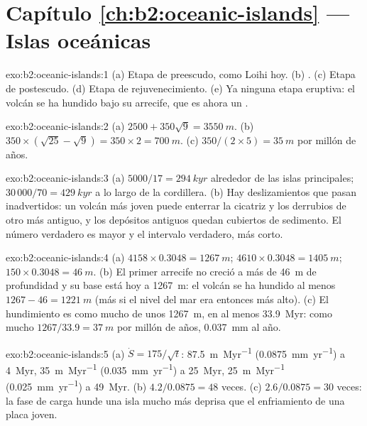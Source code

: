 \section*{Capítulo \ref{ch:b2:oceanic-islands} --- Islas oceánicas}

\begin{solution}{exo:b2:oceanic-islands:1}
(a) Etapa de preescudo, como Loihi hoy. (b) . (c) Etapa de postescudo. (d) Etapa de
rejuvenecimiento. (e) Ya ninguna etapa eruptiva: el volcán se ha hundido bajo su arrecife, que es ahora un .
\end{solution}

\begin{solution}{exo:b2:oceanic-islands:2}
(a) $2500 + 350\sqrt9 = \qty{3550}{m}$. (b) $350\times(\sqrt{25} - \sqrt9) = 350\times2 =
\qty{700}{m}$. (c) $350/(2\times5) = \qty{35}{m}$ por millón de años.
\end{solution}

\begin{solution}{exo:b2:oceanic-islands:3}
(a) $5000/17 = \qty{294}{kyr}$ alrededor de las islas principales; $30\,000/70 = \qty{429}{kyr}$ a lo largo de la
cordillera. (b) Hay deslizamientos que pasan inadvertidos: un volcán más joven puede enterrar la cicatriz y los derrubios de otro más antiguo,
y los depósitos antiguos quedan cubiertos de sedimento. El número verdadero es mayor y el intervalo verdadero,
más corto.
\end{solution}

\begin{solution}{exo:b2:oceanic-islands:4}
(a) $4158\times0.3048 = \qty{1267}{m}$; $4610\times0.3048 = \qty{1405}{m}$; $150\times0.3048 =
\qty{46}{m}$. (b) El primer arrecife no creció a más de \qty{46}{m} de profundidad y su base está hoy a
\qty{1267}{m}: el volcán se ha hundido al menos $1267 - 46 = \qty{1221}{m}$ (más si el nivel del mar
era entonces más alto). (c) El hundimiento es como mucho de unos \qty{1267}{m}, en al menos \qty{33.9}{Myr}:
como mucho $1267/33.9 = \qty{37}{m}$ por millón de años, \qty{0.037}{mm} al año.
\end{solution}

\begin{solution}{exo:b2:oceanic-islands:5}
(a) $\dot S = 175/\sqrt t$: \qty{87.5}{m.Myr^{-1}} (\qty{0.0875}{mm.yr^{-1}}) a \qty{4}{Myr},
\qty{35}{m.Myr^{-1}} (\qty{0.035}{mm.yr^{-1}}) a \qty{25}{Myr}, \qty{25}{m.Myr^{-1}}
(\qty{0.025}{mm.yr^{-1}}) a \qty{49}{Myr}. (b) $4.2/0.0875 = 48$ veces. (c) $2.6/0.0875 = 30$
veces: la fase de carga hunde una isla mucho más deprisa que el enfriamiento de una placa joven.
\end{solution}

